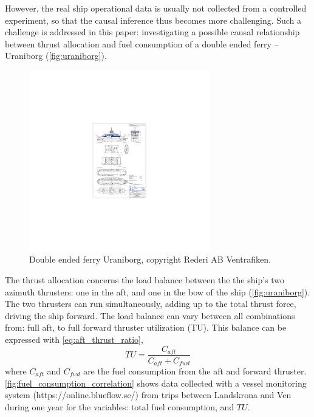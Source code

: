 However, the real ship operational data is usually not collected from a controlled experiment, so that the causal inference thus becomes more challenging. Such a challenge is addressed in this paper: investigating a possible causal relationship between thrust allocation and fuel consumption of a double ended ferry -- Uraniborg (\autoref{fig:uraniborg}).
\begin{figure}[!htb]
    \centering
    \includegraphics[width=0.7\textwidth]{figures/GA_uraniborg.pdf}
    \caption{Double ended ferry Uraniborg, copyright Rederi AB Ventrafiken.}
    \label{fig:uraniborg}
\end{figure}
The thrust allocation concerns the load balance between the the ship's two azimuth thrusters: one in the aft, and one in the bow of the ship (\autoref{fig:uraniborg}). The two thrusters can run simultaneously, adding up to the total thrust force, driving the ship forward. The load balance can vary between all combinations from: full aft, to full forward thruster utilization (TU). This balance can be expressed with \autoref{eq:aft_thrust_ratio},
\begin{equation}
    TU = \frac{C_{aft}}{C_{aft} + C_{fwd}}
    \label{eq:aft_thrust_ratio}
\end{equation}
where $C_{aft}$ and $C_{fwd}$ are the fuel consumption from the aft and forward thruster.
\autoref{fig:fuel_consumption_correlation} shows data collected with a vessel monitoring system (https://online.blueflow.se/) from trips between Landskrona and Ven during one year for the variables: total fuel consumption, and $TU$. 
